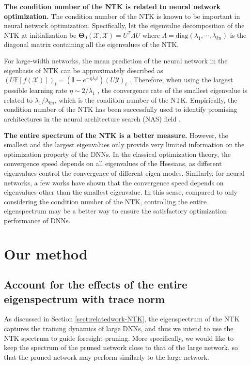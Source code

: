 \documentclass{article} %
\begin{document}
\textbf{The condition number of the NTK is related to neural network optimization.} The condition number of the NTK is known to be important in neural network optimization. Specifically, let the eigenvalue decomposition of the NTK at initialization be $\boldsymbol{\Theta}_0(\mathcal{X},\mathcal{X})=U^T\Lambda U$ where $\Lambda=\textrm{diag}(\lambda_1, \cdots, \lambda_{kn})$ is the diagonal matrix containing all the eigenvalues of the NTK. 

For large-width networks, the mean prediction of the neural network in the eigenbasis of NTK can be approximately described as $(U\mathbb{E}\left[f(\mathcal{X})\right])_i=(\textbf{I}-e^{-\eta\lambda_i t})(U\mathcal{Y})_i$ \citep{xiao2020disentangling}. Therefore, when using the largest possible learning rate $\eta \sim 2/\lambda_1$ \citep{lee2019wide}, the convergence rate of the smallest eigenvalue is related to $\lambda_1/\lambda_{kn}$, which is the condition number of the NTK. Empirically, the condition number of the NTK has been successfully used to identify promising architectures in the neural architecture search (NAS) field \citep{tenas, MetaNTK-NAS}. 

\textbf{The entire spectrum of the NTK is a better measure.} However, the smallest and the largest eigenvalues only provide very limited information on the optimization property of the DNNs. In the classical optimization theory, the convergence speed depends on all eigenvalues of the Hessians, as different eigenvalues control the convergence of different eigen-modes. Similarly, for neural networks, a few works \citep{kopitkov2020neural,su2019learning} have shown that the convergence speed depends on eigenvalues other than the smallest eigenvalue. In this sense, compared to only considering the condition number of the NTK, controlling the entire eigenspectrum may be a better way to ensure the satisfactory optimization performance of DNNs.

\section{Our method}

\subsection{Account for the effects of the entire eigenspectrum with trace norm}
As discussed in Section \ref{sect:relatedwork-NTK}, the eigenspectrum of the NTK captures the training dynamics of large DNNs, and thus we
intend to use the NTK spectrum to guide foresight pruning. 
More specifically, we would like to keep the spectrum of the pruned network close to that of the large network, so that the pruned network may 
perform similarly to the large network. 
\end{document}
